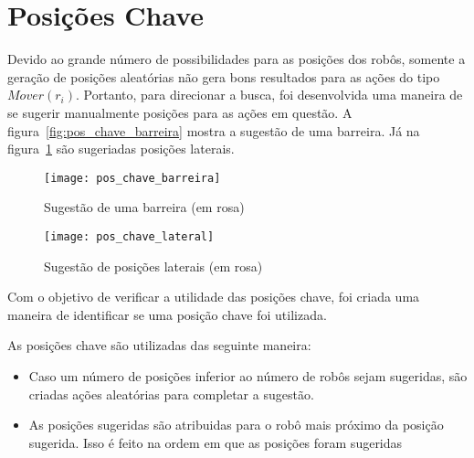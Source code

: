 \section{Posições Chave}\label{sec:pos_chave}

Devido ao grande número de possibilidades para
as posições dos robôs, somente a geração de
posições aleatórias não gera bons resultados
para as ações do tipo $Mover(r_i)$. Portanto,
para direcionar a busca, foi desenvolvida uma
maneira de se sugerir manualmente posições para
as ações em questão. A figura~\ref{fig:pos_chave_barreira}
mostra a sugestão de uma barreira. Já na
figura~\ref{fig:pos_chave_lateral} são sugeriadas
posições laterais. 

\begin{figure}
  \centering
  \texttt{[image: pos\_chave\_barreira]}
  \caption{Sugestão de uma barreira (em rosa)}\label{fig:pos_chave_barreira}
  \texttt{[image: pos\_chave\_lateral]}
  \caption{Sugestão de posições laterais (em rosa)}\label{fig:pos_chave_lateral}
\end{figure}

Com o objetivo de verificar a utilidade das posições chave,
foi criada uma maneira de identificar se uma posição chave
foi utilizada.

As posições chave são utilizadas das seguinte maneira:
\begin{itemize}
  \item Caso um número de posições inferior ao número de
        robôs sejam sugeridas, são criadas ações aleatórias
        para completar a sugestão. 
  \item As posições sugeridas são atribuidas para o robô
        mais próximo da posição sugerida. Isso é feito
        na ordem em que as posições foram sugeridas
\end{itemize}
